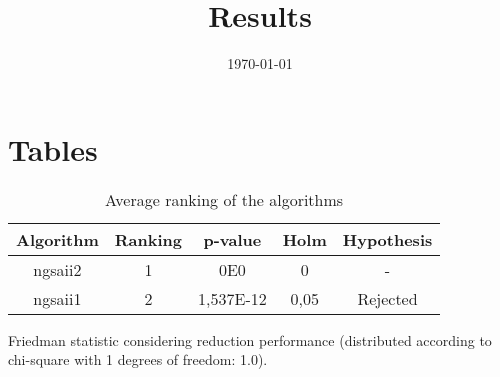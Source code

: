 \documentclass{article}
\title{Results}
\author{}
\date{\today}
\begin{document}
\oddsidemargin 0in \topmargin 0in\maketitle

\section{Tables}
\begin{table}[!htp]
\centering
\begin{tabular}{c|c|c|c|c}
Algorithm&Ranking&p-value&Holm&Hypothesis\\
\hline
ngsaii2 & 1 & 0E0 & 0 & -\\
ngsaii1 & 2 & 1,537E-12 & 0,05 & Rejected\\
\end{tabular}
\caption{Average ranking of the algorithms}
\end{table}


Friedman statistic considering reduction performance (distributed according to chi-square with 1 degrees of freedom: 1.0).
\end{document}
